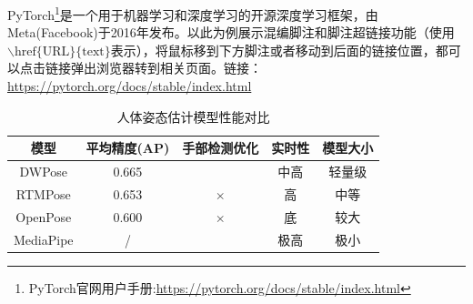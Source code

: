 \documentclass[a4paper,scheme=chinese,linespread=1.5]{ctexbook} %
\begin{document}
	PyTorch\footnote{PyTorch官网用户手册:\href{https://pytorch.org/docs/stable/index.html}{https://pytorch.org/docs/stable/index.html}}是一个用于机器学习和深度学习的开源深度学习框架，由Meta(Facebook)于2016年发布。以此为例展示混编脚注和脚注超链接功能（使用$\backslash \text{href\{URL\}\{text\}}$表示），将鼠标移到下方脚注\footnotemark[2]{}或者移动到后面的链接位置，都可以点击链接弹出浏览器转到相关页面。链接：\href{https://pytorch.org/docs/stable/index.html}{https://pytorch.org/docs/stable/index.html}
	
	
	\begin{table}[H]
		\centering
		\caption{人体姿态估计模型性能对比}
		\vspace*{-1em}
		\begin{tabular}{ccccc} %
			\toprule[1.5pt]
			模型   &  平均精度(AP) & 手部检测优化 & 实时性 & 模型大小 \\ \midrule[0.75pt]
			\setcounter{footnote}{1}
			DWPose\footnotemark[2]{}    & 0.665      & \checkmark                 & 中高       & 轻量级         \\
			\setcounter{footnote}{3}
			RTMPose\footnotemark[1]{}     & 0.653      & $\times$                & 高      &  中等          \\
			OpenPose\footnotemark{}    & 0.600        & $\times$                & 底       &  较大            \\ \cmidrule[0.5pt]{1-2}
			MediaPipe\footnotemark{}     & /      &  \checkmark                 & 极高       &  极小        \\
			\bottomrule[1.5pt]
		\end{tabular}
		\label{tab:1.2}
	\end{table}
	
	\setcounter{footnote}{3}
	
	\addtocounter{footnote}{1}
	
\end{document}
